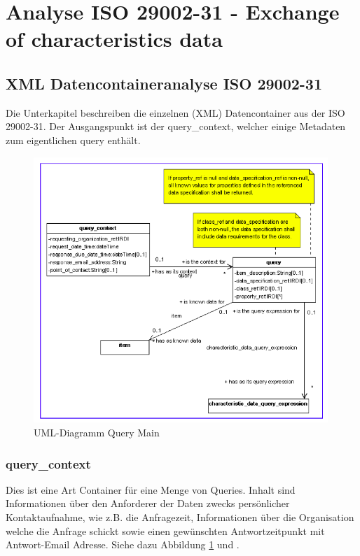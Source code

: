 \section{Analyse ISO 29002-31 - Exchange of characteristics data}


\subsection{XML Datencontaineranalyse ISO 29002-31}
Die Unterkapitel beschreiben die einzelnen (XML) Datencontainer aus der ISO 29002-31. Der Ausgangspunkt ist der query\_context, welcher einige Metadaten zum eigentlichen query enthält. 

\begin{figure}[htbp]
	\centering
		\includegraphics[width=0.99\textwidth]{images/query_main.png}
		\caption[UML-Diagramm Query Main]{UML-Diagramm Query Main\footnotemark}
	\label{fig:querymain}
\end{figure}

\subsubsection{query\_context}
Dies ist eine Art Container für eine Menge von Queries. Inhalt sind Informationen über den Anforderer der Daten zwecks persönlicher Kontaktaufnahme, wie z.B. die Anfragezeit, Informationen über die Organisation welche die Anfrage schickt sowie einen gewünschten Antwortzeitpunkt mit Antwort-Email Adresse. Siehe dazu Abbildung \ref{fig:querymain} und \citep[Kap. 5.2.2][]{iso29002-31}.  


